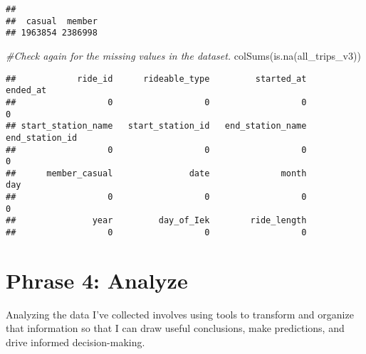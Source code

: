 \documentclass[
]{article}
\newenvironment{Shaded}{\begin{snugshade}}{\end{snugshade}}
\newcommand{\CommentTok}[1]{\textcolor[rgb]{0.56,0.35,0.01}{\textit{#1}}}
\newcommand{\FunctionTok}[1]{\textcolor[rgb]{0.00,0.00,0.00}{#1}}
\newcommand{\NormalTok}[1]{#1}
\newcommand{\OtherTok}[1]{\textcolor[rgb]{0.56,0.35,0.01}{#1}}
\newcommand{\SpecialCharTok}[1]{\textcolor[rgb]{0.00,0.00,0.00}{#1}}
\begin{document}
\begin{Shaded}
\end{Shaded}

\begin{verbatim}
## 
##  casual  member 
## 1963854 2386998
\end{verbatim}

\begin{Shaded}
\begin{Highlighting}[]
\CommentTok{\#Check again for the missing values in the dataset.}
\FunctionTok{colSums}\NormalTok{(}\FunctionTok{is.na}\NormalTok{(all\_trips\_v3))}
\end{Highlighting}
\end{Shaded}

\begin{verbatim}
##            ride_id      rideable_type         started_at           ended_at 
##                  0                  0                  0                  0 
## start_station_name   start_station_id   end_station_name     end_station_id 
##                  0                  0                  0                  0 
##      member_casual               date              month                day 
##                  0                  0                  0                  0 
##               year         day_of_Iek        ride_length 
##                  0                  0                  0
\end{verbatim}

\hypertarget{phrase-4-analyze}{%
\section{Phrase 4: Analyze}\label{phrase-4-analyze}}

Analyzing the data I've collected involves using tools to transform and
organize that information so that I can draw useful conclusions, make
predictions, and drive informed decision-making.
\end{document}
